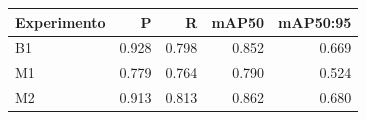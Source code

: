 \begin{tabular}{lrrrr}
\toprule
Experimento & P & R & mAP50 & mAP50:95 \\
\midrule
B1 & 0.928 & 0.798 & 0.852 & 0.669 \\
M1 & 0.779 & 0.764 & 0.790 & 0.524 \\
M2 & 0.913 & 0.813 & 0.862 & 0.680 \\
\bottomrule
\end{tabular}
